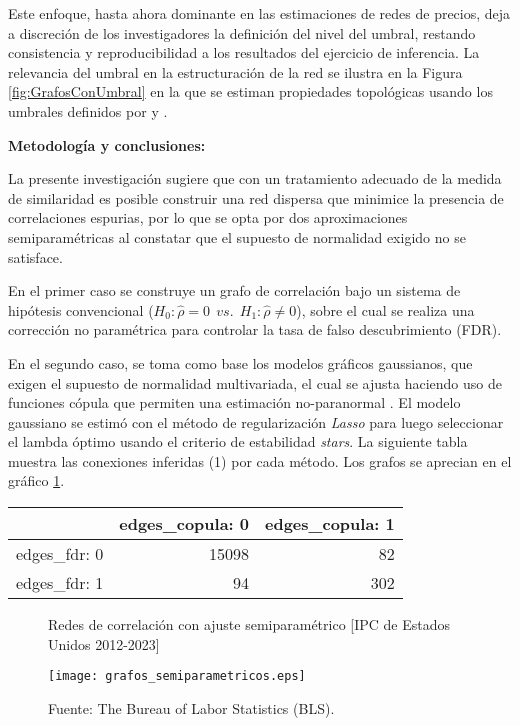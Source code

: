 \documentclass[11pt]{article}
\begin{document}
	Este enfoque, hasta ahora dominante en las estimaciones de redes de precios, deja a discreción de los investigadores la definición del nivel del umbral, restando consistencia y reproducibilidad a los resultados del ejercicio de inferencia. La relevancia del umbral en la estructuración de la red se ilustra en la Figura \ref{fig:GrafosConUmbral} en la que se estiman propiedades topológicas usando los umbrales definidos por \citet{alvarez2021dinamica} y \citet{sarantitis2018network}. \vspace{5mm}
	
\textbf{Metodología y conclusiones:}
	
	La presente investigación sugiere que con un tratamiento adecuado de la medida de similaridad es posible construir una red dispersa que minimice la presencia de correlaciones espurias, por lo que se opta por dos aproximaciones semiparamétricas al constatar que el supuesto de normalidad exigido no se satisface.
	
	En el primer caso se construye un grafo de correlación bajo un sistema de hipótesis convencional ($H_{0}: \hat{\rho} = 0  \ \  vs.  \  \ H_{1}: \hat{\rho} \neq 0$), sobre el cual se realiza una corrección no paramétrica para controlar la tasa de falso descubrimiento (FDR). 
	
	En el segundo caso, se toma como base los modelos gráficos gaussianos, que exigen el supuesto de normalidad multivariada, el cual se ajusta haciendo uso de funciones cópula que permiten una estimación no-paranormal \citep{liu2009nonparanormal}. El modelo gaussiano se estimó con el método de regularización \textit{Lasso} para luego seleccionar el lambda óptimo usando el criterio de estabilidad \textit{stars}. La siguiente tabla muestra las conexiones inferidas (1) por cada método. Los grafos se aprecian en el gráfico \ref{fig:Grafossemipara}. 
	\
	\begin{table}[ht]
		\centering
		\begin{tabular}{rrr}
			\hline
			& edges\_copula: 0 & edges\_copula: 1 \\ 
			\hline
			edges\_fdr: 0 & 15098 &  82 \\ 
			edges\_fdr: 1 &  94 & 302 \\ 
			\hline
		\end{tabular}
	\end{table}
	 
	\begin{figure}[h!]
		\centering
		\caption{Redes de correlación con ajuste semiparamétrico [IPC de Estados Unidos 2012-2023]}  %
		\texttt{[image: grafos\_semiparametricos.eps]}
		\captionsetup{justification=justified, singlelinecheck=false}
		\caption*{Fuente: The Bureau of Labor Statistics (BLS).}  %
		\label{fig:Grafossemipara}
	\end{figure}
	
	
\newpage
		 
		 
\nocite{*}


\end{document}
